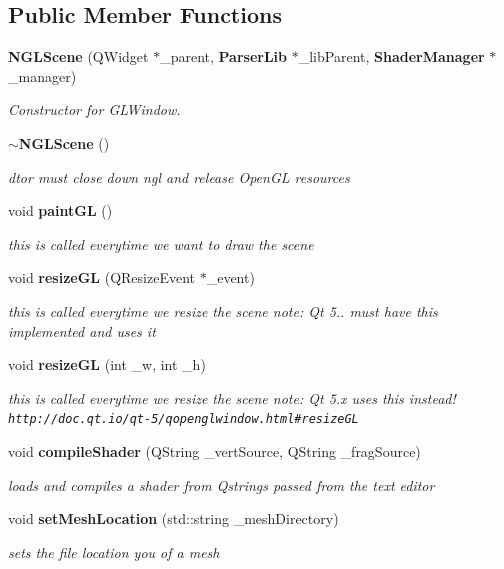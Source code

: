 \subsection*{Public Member Functions}
\begin{DoxyCompactItemize}
\item 
{\bf N\-G\-L\-Scene} (Q\-Widget $\ast$\-\_\-parent, {\bf Parser\-Lib} $\ast$\-\_\-lib\-Parent, {\bf Shader\-Manager} $\ast$\-\_\-manager)
\begin{DoxyCompactList}\small\item\em Constructor for G\-L\-Window. \end{DoxyCompactList}\item 
{\bf $\sim$\-N\-G\-L\-Scene} ()
\begin{DoxyCompactList}\small\item\em dtor must close down ngl and release Open\-G\-L resources \end{DoxyCompactList}\item 
void {\bf paint\-G\-L} ()
\begin{DoxyCompactList}\small\item\em this is called everytime we want to draw the scene \end{DoxyCompactList}\item 
void {\bf resize\-G\-L} (Q\-Resize\-Event $\ast$\-\_\-event)
\begin{DoxyCompactList}\small\item\em this is called everytime we resize the scene note\-: Qt 5.. must have this implemented and uses it \end{DoxyCompactList}\item 
void {\bf resize\-G\-L} (int \-\_\-w, int \-\_\-h)
\begin{DoxyCompactList}\small\item\em this is called everytime we resize the scene note\-: Qt 5.\-x uses this instead! {\tt http\-://doc.\-qt.\-io/qt-\/5/qopenglwindow.\-html\#resize\-G\-L} \end{DoxyCompactList}\item 
void {\bf compile\-Shader} (Q\-String \-\_\-vert\-Source, Q\-String \-\_\-frag\-Source)
\begin{DoxyCompactList}\small\item\em loads and compiles a shader from Qstrings passed from the text editor \end{DoxyCompactList}\item 
void {\bf set\-Mesh\-Location} (std\-::string \-\_\-mesh\-Directory)
\begin{DoxyCompactList}\small\item\em sets the file location you of a mesh \end{DoxyCompactList}\item 

\end{DoxyCompactItemize}
